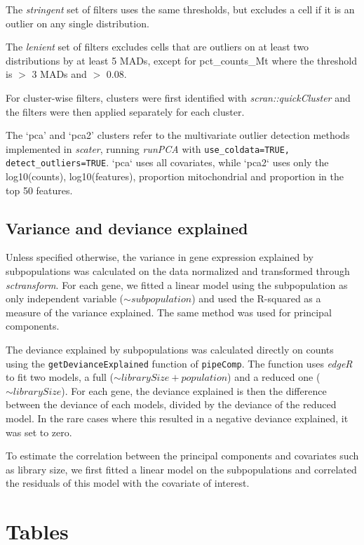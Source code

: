 \documentclass[11pt]{article}
\begin{document}
The \textit{stringent} set of filters uses the same thresholds, but excludes a cell if it is an outlier on any single distribution. 

The \textit{lenient} set of filters excludes cells that are outliers on at least two distributions by at least 5 MADs, except for pct\_counts\_Mt where the threshold is $>$ 3 MADs and $>$ 0.08.

For cluster-wise filters, clusters were first identified with \textit{scran::quickCluster} and the filters were then applied separately for each cluster. 

The `pca' and `pca2' clusters refer to the multivariate outlier detection methods implemented in \textit{scater}, running \textit{runPCA} with \texttt{use\_coldata=TRUE, detect\_outliers=TRUE}. `pca` uses all covariates, while `pca2` uses only the log10(counts), log10(features), proportion mitochondrial and proportion in the top 50 features.

\subsection*{Variance and deviance explained}

Unless specified otherwise, the variance in gene expression explained by subpopulations was calculated on the data normalized and transformed through \textit{sctransform}. For each gene, we fitted a linear model using the subpopulation as only independent variable ($\sim subpopulation$) and used the R-squared as a measure of the variance explained. The same method was used for principal components.

The deviance explained by subpopulations was calculated directly on counts using the \linebreak \texttt{getDevianceExplained} function of \texttt{pipeComp}. The function uses \textit{edgeR} to fit two models, a full ($\sim librarySize + population$) and a reduced one ($\sim librarySize$). For each gene, the deviance explained is then the difference between the deviance of each models, divided by the deviance of the reduced model. In the rare cases where this resulted in a negative deviance explained, it was set to zero.

To estimate the correlation between the principal components and covariates such as library size, we first fitted a linear model on the subpopulations and correlated the residuals of this model with the covariate of interest.


\section*{Tables}
\end{document}

